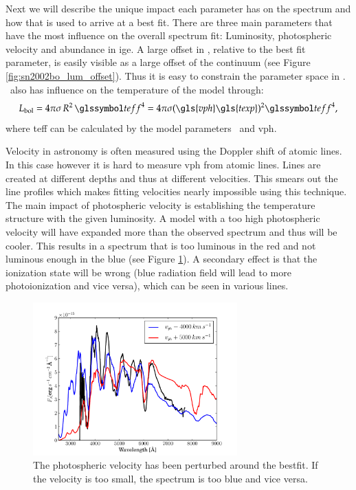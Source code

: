 Next we will describe the unique impact each parameter has on the spectrum and how that is used to arrive at a best fit. There are three main parameters that have the most influence on the overall spectrum fit: Luminosity, photospheric velocity and abundance in \gls{ige}.
A large offset in \lum, relative to the best fit parameter, is easily visible as a large offset of the continuum (see Figure \ref{fig:sn2002bo_lum_offset}). Thus it is easy to constrain the parameter space in \lum. \lum\ also has influence on the temperature of the model through:
\[
L_{\rm bol} = 4\pi\sigma\, R^2\,\teff^4 = 4\pi\sigma(\gls{vph}\gls{texp})^2 \teff^4,
\label{eq:lum_temp_relation}
\]
where \gls{teff} can be calculated by the model parameters \lum\ and \gls{vph}. 

Velocity in astronomy is often measured using the Doppler shift of atomic lines. In this case however it is hard to measure \gls{vph} from atomic lines.  Lines are created at different depths and thus at different velocities. This smears out the line profiles which makes fitting velocities nearly impossible using this technique. The main impact of photospheric velocity is establishing the temperature structure with the given luminosity. A model with a too high photospheric velocity will have expanded more than the observed spectrum and thus will be cooler. This results in a spectrum that is too luminous in the red and not luminous enough in the blue (see Figure \ref{fig:sn2002bo_vph_offset}). A secondary effect is that the ionization state will be wrong (blue radiation field will lead to more photoionization and vice versa), which can be seen in various lines. 


\begin{figure}[tb] %
   \centering
   \includegraphics[width=0.7\textwidth]{chapter_dalek/plots/bf2002bo-10_vph.pdf} 
   \caption[Effect of photospheric velocity on MLMC fit]{The photospheric velocity has been perturbed around the bestfit. If the velocity is too small, the spectrum is too blue and vice versa.}
   \label{fig:sn2002bo_vph_offset}
\end{figure}



